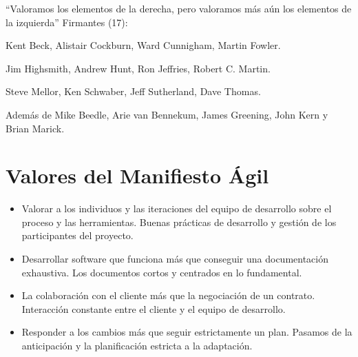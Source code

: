\documentclass[12pt,twoside,titlepage]{report}
\begin{document}
“Valoramos los elementos de la derecha, pero valoramos más aún los elementos de la izquierda”
Firmantes (17):

\begin{compactitem}
    \item Kent Beck, Alistair Cockburn, Ward Cunnigham, Martin Fowler.
    \item Jim Highsmith, Andrew Hunt, Ron Jeffries, Robert C. Martin.
    \item Steve Mellor, Ken Schwaber, Jeff Sutherland, Dave Thomas.
    \item Además de Mike Beedle, Arie van Bennekum, James Greening, John Kern y Brian Marick.
\end{compactitem}

\section{Valores del Manifiesto Ágil}
\begin{itemize}
    \item Valorar a los individuos y las iteraciones del equipo de desarrollo sobre el proceso y las herramientas. Buenas prácticas de desarrollo y gestión de los participantes del proyecto.
    \item Desarrollar software que funciona más que conseguir una documentación exhaustiva. Los documentos cortos y centrados en lo fundamental.
    \item La colaboración con el cliente más que la negociación de un contrato. Interacción constante entre el cliente y el equipo de desarrollo.
    \item Responder a los cambios más que seguir estrictamente un plan. Pasamos de la anticipación y la planificación estricta a la adaptación.
\end{itemize}
\end{document}
